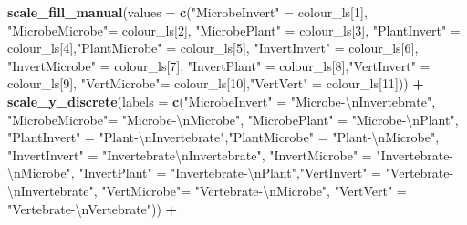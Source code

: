 \documentclass[
]{article}
\newenvironment{Shaded}{\begin{snugshade}}{\end{snugshade}}
\newcommand{\CharTok}[1]{\textcolor[rgb]{0.31,0.60,0.02}{#1}}
\newcommand{\DataTypeTok}[1]{\textcolor[rgb]{0.13,0.29,0.53}{#1}}
\newcommand{\DecValTok}[1]{\textcolor[rgb]{0.00,0.00,0.81}{#1}}
\newcommand{\KeywordTok}[1]{\textcolor[rgb]{0.13,0.29,0.53}{\textbf{#1}}}
\newcommand{\NormalTok}[1]{#1}
\newcommand{\OperatorTok}[1]{\textcolor[rgb]{0.81,0.36,0.00}{\textbf{#1}}}
\newcommand{\StringTok}[1]{\textcolor[rgb]{0.31,0.60,0.02}{#1}}
\begin{document}
\begin{Shaded}
\begin{Highlighting}[]
{{{{{\StringTok{  }\KeywordTok{scale_fill_manual}\NormalTok{(}\DataTypeTok{values =} \KeywordTok{c}\NormalTok{(}\StringTok{"MicrobeInvert"}\NormalTok{ =}\StringTok{ }\NormalTok{colour_ls[}\DecValTok{1}\NormalTok{],  }\StringTok{"MicrobeMicrobe"}\NormalTok{=}\StringTok{ }\NormalTok{colour_ls[}\DecValTok{2}\NormalTok{], }\StringTok{"MicrobePlant"}\NormalTok{ =}\StringTok{ }\NormalTok{colour_ls[}\DecValTok{3}\NormalTok{], }\StringTok{"PlantInvert"}\NormalTok{ =}\StringTok{ }\NormalTok{colour_ls[}\DecValTok{4}\NormalTok{],}\StringTok{"PlantMicrobe"}\NormalTok{ =}\StringTok{ }\NormalTok{colour_ls[}\DecValTok{5}\NormalTok{], }\StringTok{"InvertInvert"}\NormalTok{  =}\StringTok{ }\NormalTok{colour_ls[}\DecValTok{6}\NormalTok{],  }\StringTok{"InvertMicrobe"}\NormalTok{ =}\StringTok{ }\NormalTok{colour_ls[}\DecValTok{7}\NormalTok{], }\StringTok{"InvertPlant"}\NormalTok{ =}\StringTok{ }\NormalTok{colour_ls[}\DecValTok{8}\NormalTok{],}\StringTok{"VertInvert"}\NormalTok{  =}\StringTok{ }\NormalTok{colour_ls[}\DecValTok{9}\NormalTok{], }\StringTok{"VertMicrobe"}\NormalTok{=}\StringTok{ }\NormalTok{colour_ls[}\DecValTok{10}\NormalTok{],}\StringTok{"VertVert"}\NormalTok{  =}\StringTok{ }\NormalTok{colour_ls[}\DecValTok{11}\NormalTok{])) }\OperatorTok{+}
\StringTok{  }\KeywordTok{scale_y_discrete}\NormalTok{(}\DataTypeTok{labels =} \KeywordTok{c}\NormalTok{(}\StringTok{"MicrobeInvert"}\NormalTok{ =}\StringTok{ "Microbe-}\CharTok{\textbackslash{}n}\StringTok{Invertebrate"}\NormalTok{,  }\StringTok{"MicrobeMicrobe"}\NormalTok{=}\StringTok{ "Microbe-}\CharTok{\textbackslash{}n}\StringTok{Microbe"}\NormalTok{, }\StringTok{"MicrobePlant"}\NormalTok{ =}\StringTok{ "Microbe-}\CharTok{\textbackslash{}n}\StringTok{Plant"}\NormalTok{, }\StringTok{"PlantInvert"}\NormalTok{ =}\StringTok{ "Plant-}\CharTok{\textbackslash{}n}\StringTok{Invertebrate"}\NormalTok{,}\StringTok{"PlantMicrobe"}\NormalTok{ =}\StringTok{ "Plant-}\CharTok{\textbackslash{}n}\StringTok{Microbe"}\NormalTok{, }\StringTok{"InvertInvert"}\NormalTok{  =}\StringTok{ "Invertebrate}\CharTok{\textbackslash{}n}\StringTok{Invertebrate"}\NormalTok{,  }\StringTok{"InvertMicrobe"}\NormalTok{ =}\StringTok{ "Invertebrate-}\CharTok{\textbackslash{}n}\StringTok{Microbe"}\NormalTok{, }\StringTok{"InvertPlant"}\NormalTok{ =}\StringTok{ "Invertebrate-}\CharTok{\textbackslash{}n}\StringTok{Plant"}\NormalTok{,}\StringTok{"VertInvert"}\NormalTok{  =}\StringTok{ "Vertebrate-}\CharTok{\textbackslash{}n}\StringTok{Invertebrate"}\NormalTok{, }\StringTok{"VertMicrobe"}\NormalTok{=}\StringTok{ "Vertebrate-}\CharTok{\textbackslash{}n}\StringTok{Microbe"}\NormalTok{, }\StringTok{"VertVert"}\NormalTok{  =}\StringTok{ "Vertebrate-}\CharTok{\textbackslash{}n}\StringTok{Vertebrate"}\NormalTok{)) }\OperatorTok{+}
}}}}}
\end{Highlighting}
\end{Shaded}
\end{document}
